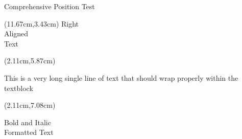 \documentclass[aspectratio=169,xcolor=dvipsnames,professionalfonts]{beamer}
\begin{document}
\begin{frame}{Comprehensive Position Test}
\begin{textblock*}{2.87cm}(11.67cm,3.43cm)
{\fontsize{14}{16.8}\selectfont\raggedleft Right\\Aligned\\Text}
\end{textblock*}

\begin{textblock*}{14.90cm}(2.11cm,5.87cm)
{\fontsize{12}{14.399999999999999}\selectfont\raggedright This is a very long single line of text that should wrap properly within the textblock}
\end{textblock*}

\begin{textblock*}{5.08cm}(2.11cm,7.08cm)
{\fontsize{16}{19.2}\selectfont\bfseries \itshape \color{secondary} \raggedright Bold and Italic\\Formatted Text}
\end{textblock*}
\end{frame}
\end{document}
